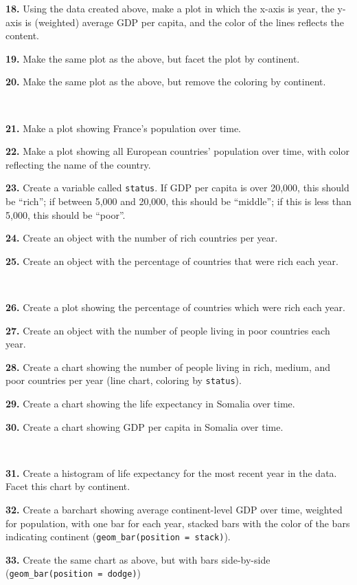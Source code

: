 \documentclass[]{book}
\begin{document}
\textbf{18.} Using the data created above, make a plot in which the x-axis is year, the y-axis is (weighted) average GDP per capita, and the color of the lines reflects the content.

\textbf{19.} Make the same plot as the above, but facet the plot by continent.

\textbf{20.} Make the same plot as the above, but remove the coloring by continent.

~

\textbf{21.} Make a plot showing France's population over time.

\textbf{22.} Make a plot showing all European countries' population over time, with color reflecting the name of the country.

\textbf{23.} Create a variable called \texttt{status}. If GDP per capita is over 20,000, this should be ``rich''; if between 5,000 and 20,000, this should be ``middle''; if this is less than 5,000, this should be ``poor''.

\textbf{24.} Create an object with the number of rich countries per year.

\textbf{25.} Create an object with the percentage of countries that were rich each year.

~

\textbf{26.} Create a plot showing the percentage of countries which were rich each year.

\textbf{27.} Create an object with the number of people living in poor countries each year.

\textbf{28.} Create a chart showing the number of people living in rich, medium, and poor countries per year (line chart, coloring by \texttt{status}).

\textbf{29.} Create a chart showing the life expectancy in Somalia over time.

\textbf{30.} Create a chart showing GDP per capita in Somalia over time.

~

\textbf{31.} Create a histogram of life expectancy for the most recent year in the data. Facet this chart by continent.

\textbf{32.} Create a barchart showing average continent-level GDP over time, weighted for population, with one bar for each year, stacked bars with the color of the bars indicating continent (\texttt{geom\_bar(position\ =\ \textquotesingle{}stack\textquotesingle{})}).

\textbf{33.} Create the same chart as above, but with bars side-by-side (\texttt{geom\_bar(position\ =\ \textquotesingle{}dodge\textquotesingle{})})
\end{document}
